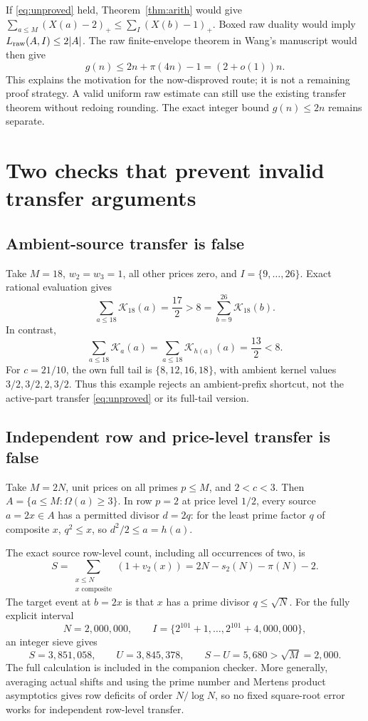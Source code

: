 \documentclass[a4paper,11pt]{article}
\theoremstyle{remark}\newtheorem{remark}[theorem]{Remark}
\newcommand{\K}{\mathcal K}
\newcommand{\Om}{\Omega}
\begin{document}
If \eqref{eq:unproved} held, Theorem~\ref{thm:arith} would give $\sum_{a\le M}(X(a)-2)_+\le\sum_I(X(b)-1)_+$. Boxed raw duality would imply $L_{\rm raw}(A,I)\le2|A|$. The raw finite-envelope theorem in Wang's manuscript would then give
\[
 g(n)\le2n+\pi(4n)-1=(2+o(1))n.
\]
This explains the motivation for the now-disproved route; it is not a remaining proof strategy. A valid uniform raw estimate can still use the existing transfer theorem without redoing rounding. The exact integer bound $g(n)\le2n$ remains separate.

\section{Two checks that prevent invalid transfer arguments}\label{sec:failure}
\subsection{Ambient-source transfer is false}
Take $M=18$, $w_2=w_3=1$, all other prices zero, and $I=\{9,\ldots,26\}$. Exact rational evaluation gives
\[
 \sum_{a\le18}\K_{18}(a)=\frac{17}{2}>8
 =\sum_{b=9}^{26}\K_{18}(b).
\]
In contrast,
\[
 \sum_{a\le18}\K_a(a)=\sum_{a\le18}\K_{h(a)}(a)=\frac{13}{2}<8.
\]
For $c=21/10$, the own full tail is $\{8,12,16,18\}$, with ambient kernel values $3/2,3/2,2,3/2$. Thus this example rejects an ambient-prefix shortcut, not the active-part transfer \eqref{eq:unproved} or its full-tail version.

\subsection{Independent row and price-level transfer is false}
Take $M=2N$, unit prices on all primes $p\le M$, and $2<c<3$. Then $A=\{a\le M:\Om(a)\ge3\}$. In row $p=2$ at price level $1/2$, every source $a=2x\in A$ has a permitted divisor $d=2q$: for the least prime factor $q$ of composite $x$, $q^2\le x$, so $d^2/2\le a=h(a)$.

The exact source row-level count, including all occurrences of two, is
\[
 S=\sum_{\substack{x\le N\\x\text{ composite}}}(1+v_2(x))
  =2N-s_2(N)-\pi(N)-2.
\]
The target event at $b=2x$ is that $x$ has a prime divisor $q\le\sqrt N$. For the fully explicit interval
\[
 N=2{,}000{,}000,\qquad
 I=\{2^{101}+1,\ldots,2^{101}+4{,}000{,}000\},
\]
an integer sieve gives
\[
 S=3{,}851{,}058,\qquad U=3{,}845{,}378,
 \qquad S-U=5{,}680>\sqrt M=2{,}000.
\]
The full calculation is included in the companion checker. More generally, averaging actual shifts and using the prime number and Mertens product asymptotics gives row deficits of order $N/\log N$, so no fixed square-root error works for independent row-level transfer.
\end{document}
